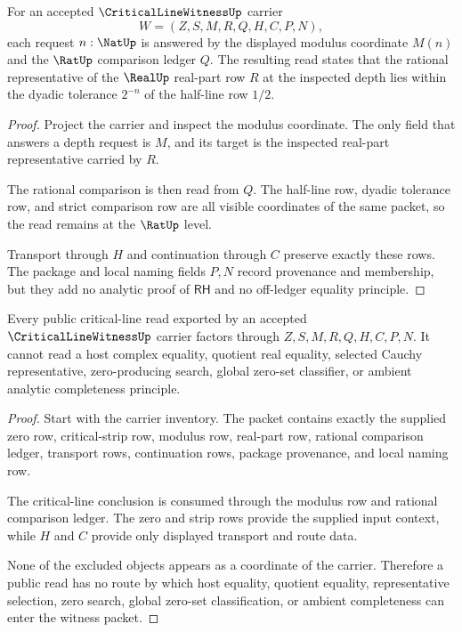 \begin{theorem}
\label{thm:critical-line-witness-modulus-row}
For an accepted $\CriticalLineWitnessUp$ carrier
$$
W=(Z,S,M,R,Q,H,C,P,N),
$$
each request $n:\NatUp$ is answered by the displayed modulus coordinate $M(n)$ and the $\RatUp$ comparison ledger $Q$. The resulting read states that the rational representative of the $\RealUp$ real-part row $R$ at the inspected depth lies within the dyadic tolerance $2^{-n}$ of the half-line row $1/2$.
\end{theorem}
\begin{proof}
Project the carrier and inspect the modulus coordinate. The only field that answers a depth request is $M$, and its target is the inspected real-part representative carried by $R$.

The rational comparison is then read from $Q$. The half-line row, dyadic tolerance row, and strict comparison row are all visible coordinates of the same packet, so the read remains at the $\RatUp$ level.

Transport through $H$ and continuation through $C$ preserve exactly these rows. The package and local naming fields $P,N$ record provenance and membership, but they add no analytic proof of $\mathsf{RH}$ and no off-ledger equality principle.
\end{proof}

\begin{theorem}
\label{thm:critical-line-witness-nonescape-boundary}
Every public critical-line read exported by an accepted $\CriticalLineWitnessUp$ carrier factors through $Z,S,M,R,Q,H,C,P,N$. It cannot read a host complex equality, quotient real equality, selected Cauchy representative, zero-producing search, global zero-set classifier, or ambient analytic completeness principle.
\end{theorem}
\begin{proof}
Start with the carrier inventory. The packet contains exactly the supplied zero row, critical-strip row, modulus row, real-part row, rational comparison ledger, transport rows, continuation rows, package provenance, and local naming row.

The critical-line conclusion is consumed through the modulus row and rational comparison ledger. The zero and strip rows provide the supplied input context, while $H$ and $C$ provide only displayed transport and route data.

None of the excluded objects appears as a coordinate of the carrier. Therefore a public read has no route by which host equality, quotient equality, representative selection, zero search, global zero-set classification, or ambient completeness can enter the witness packet.
\end{proof}

